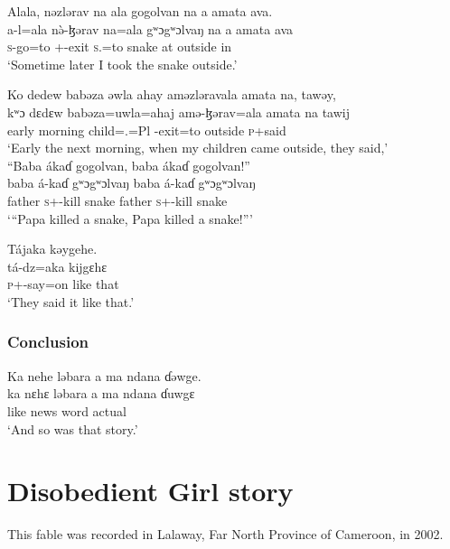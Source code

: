 \ea  Alala,  nəzlərav  na ala  gogolvan  na   a  amata  ava. \\
\gll a-l=ala    n\`ə-ɮərav         na=ala  gʷɔgʷɔlvaŋ  na  a  amata  ava\\
\textsc{s}-go=to  {\oneS}+{\PFV}-exit  \textsc{s}.{\DO}=to  snake        {\PSP}    at   outside  in\\
\glt ‘Sometime later I took the snake outside.’ 
\z

\ea Ko  dedew  babəza  əwla  ahay  aməzləravala  amata  na, tawəy,\\
\gll kʷɔ     dɛdɛw     babəza=uwla=ahaj  amə-ɮərav=ala  amata      na    tawij\\
early   morning  child={\oneS}.{\POSS}=Pl  {\NOM}{}-exit=to     outside   {\PSP}    \textsc{p}+said\\
\glt ‘Early the next morning, when my children came outside, they said,’\\

\largerpage[2]
\medskip
 “Baba  ákaɗ  gogolvan,  baba   ákaɗ  gogolvan!”\\
\gll baba     á-kaɗ gʷɔgʷɔlvaŋ  baba   á-kaɗ gʷɔgʷɔlvaŋ\\
father   \textsc{s}+{\IFV}-kill      snake    father   \textsc{s}+{\IFV}-kill      snake\\
\glt  ‘“Papa killed a snake, Papa killed a snake!”’
\z

\ea Tájaka  kəygehe.\\
\gll tá-dz=aka   kijgɛhɛ\\
\textsc{p}+{\IFV}-say=on  {like that}\\
\glt ‘They said it like that.’
\z

\subsubsection*{Conclusion}
\ea Ka  nehe  ləbara  a  ma  ndana  ɗəwge.\\
\gll ka  nɛhɛ  ləbara  a       ma      ndana  ɗuwgɛ\\
like  {\DEM}  news    {\GEN}  word  {\DEM}      actual\\
\glt ‘And so was that story.’
\z

\section[Disobedient Girl story]{Disobedient Girl story\\\hspace{1.5em} \textnormal{}}\setcounter{equation}{0}
\hypertarget{RefHeading1210341525720847}{}\label{sec:1.5}
This fable was recorded in Lalaway, Far North Province of Cameroon, in 2002. 

